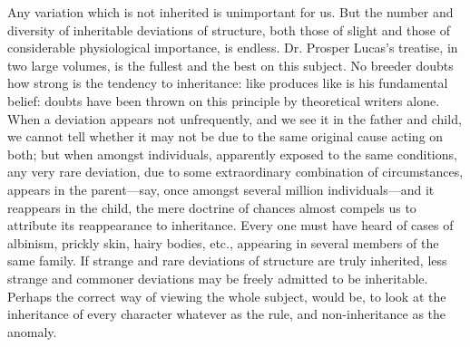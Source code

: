 \documentclass{book}
\begin{document}
Any variation which is not inherited is unimportant for us. But the number and
diversity of inheritable deviations of structure, both those of slight and
those of considerable physiological importance, is endless. Dr. Prosper
Lucas's treatise, in two large volumes, is the fullest and the best on
this subject. No breeder doubts how strong is the tendency to inheritance: like
produces like is his fundamental belief: doubts have been thrown on this
principle by theoretical writers alone. When a
deviation appears not unfrequently, and we see it in the father and child, we
cannot tell whether it may not be due to the same original cause acting on
both; but when amongst individuals, apparently exposed to the same conditions,
any very rare deviation, due to some extraordinary combination of
circumstances, appears in the parent---say, once amongst several million
individuals---and it reappears in the child, the mere doctrine of chances
almost compels us to attribute its reappearance to inheritance. Every one must
have heard of cases of albinism, prickly skin, hairy bodies, etc., appearing in
several members of the same family. If strange and rare deviations of structure
are truly inherited, less strange and commoner deviations may be freely
admitted to be inheritable. Perhaps the correct way of viewing the whole
subject, would be, to look at the inheritance of every character whatever as
the rule, and non-inheritance as the anomaly.
\end{document}
